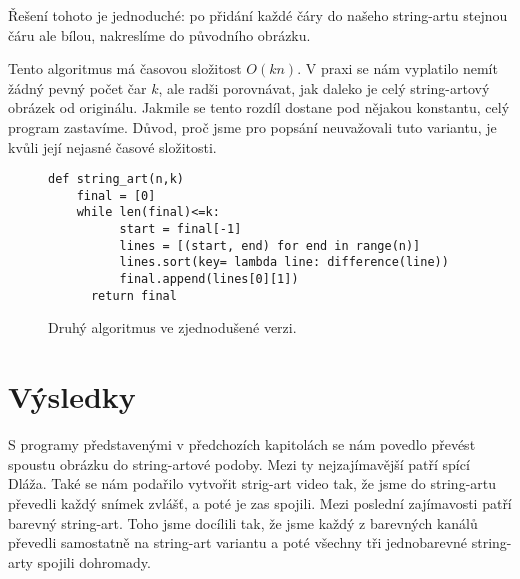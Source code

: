 \documentclass{article}
\begin{document}
Řešení tohoto je jednoduché: po přidání každé čáry do našeho string-artu stejnou
čáru ale bílou, nakreslíme do původního obrázku.

Tento algoritmus má časovou složitost $O(kn)$. V praxi se nám vyplatilo nemít
žádný pevný počet čar $k$, ale radši porovnávat, jak daleko je celý string-artový obrázek od
originálu. Jakmile se tento rozdíl dostane pod nějakou konstantu, celý
program zastavíme. Důvod, proč jsme pro popsání neuvažovali tuto variantu, je kvůli její
nejasné časové složitosti. 


\begin{figure}
 \label{fig:second}
\begin{mdframed}[style=MyFrame]
\begin{lstlisting}[style=metoo]
def string_art(n,k)
    final = [0]
    while len(final)<=k:
	      start = final[-1]
	      lines = [(start, end) for end in range(n)]
	      lines.sort(key= lambda line: difference(line))
	      final.append(lines[0][1])
	  return final
 \end{lstlisting}
\end{mdframed}

 \caption{Druhý algoritmus ve zjednodušené verzi.}
\end{figure}




\section{Výsledky}
\label{sec:vysledky}
S programy představenými v předchozích kapitolách se nám povedlo převést spoustu
obrázku do string-artové podoby. Mezi ty nejzajímavější patří spící Dláža. Také
se nám podařilo vytvořit strig-art video tak, že jsme do
string-artu převedli každý snímek zvlášť, a poté je zas spojili. Mezi poslední
zajímavosti patří barevný string-art. Toho jsme docílili tak, že jsme každý z
barevných kanálů převedli samostatně na string-art variantu a poté všechny tři
jednobarevné string-arty spojili dohromady.


\end{document}
